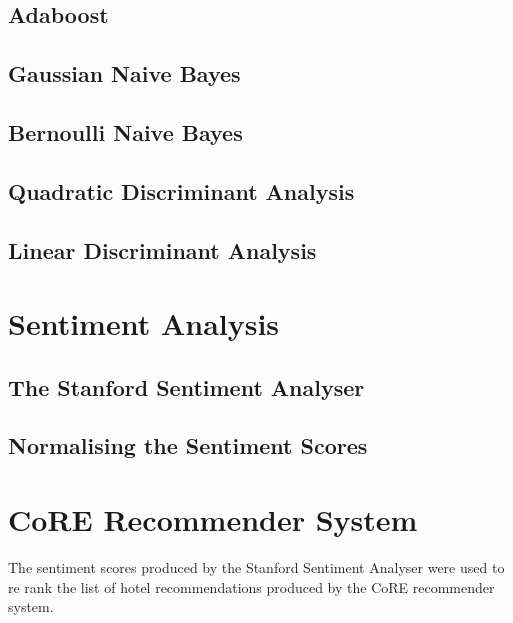 \subsection*{Adaboost}

\subsection*{Gaussian Naive Bayes}

\subsection*{Bernoulli Naive Bayes}

\subsection*{Quadratic Discriminant Analysis}

\subsection*{Linear Discriminant Analysis}


\section{Sentiment Analysis}

\subsection*{The Stanford Sentiment Analyser}
\subsection*{Normalising the Sentiment Scores}

\section{CoRE Recommender System}

The sentiment scores produced by the Stanford Sentiment Analyser were used to re rank the list of hotel recommendations produced by the CoRE recommender system.
